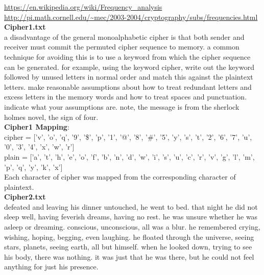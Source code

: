 \documentclass{exam}
\begin{document}
\url{https://en.wikipedia.org/wiki/Frequency_analysis} \\
\url{http://pi.math.cornell.edu/~mec/2003-2004/cryptography/subs/frequencies.html}
\vspace{0.05in} \\
\textbf{Cipher1.txt} \vspace{0.05in} \\
a disadvantage of the general monoalphabetic cipher is that both sender and receiver must commit the permuted cipher sequence to memory. a common technique for avoiding this is to use a keyword from which the cipher sequence can be generated. for example, using the keyword cipher, write out the keyword followed by unused letters in normal order and match this against the plaintext letters. make reasonable assumptions about how to treat redundant letters and excess letters in the memory words and how to treat spaces and punctuation. indicate what your assumptions are. note, the message is from the sherlock holmes novel, the sign of four. \vspace{0.05in} \\
\textbf{Cipher1 Mapping}: \vspace{0.05in} \\
cipher = ['v', 'o', 'q', '9', '\$', 'p', '1', '@', '8', '\#', '5', 'y', 's', 't', '2', '6', '7', 'u', '0', '3', '4', 'x', 'w', 'r'] \vspace{0.05in} \\
plain = ['a', 't', 'h', 'e', 'o', 'f', 'b', 'n', 'd', 'w', 'i', 's', 'u', 'c', 'r', 'v', 'g', 'l', 'm', 'p', 'q', 'y', 'k', 'x'] \vspace{0.05in} \\
Each character of cipher was mapped from the corresponding character of plaintext.
\vspace{0.05in}\\
\textbf{Cipher2.txt} \vspace{0.05in} \\
defeated and leaving his dinner untouched, he went to bed. that night he did not sleep well, having feverish dreams, having no rest. he was unsure whether he was asleep or dreaming. conscious, unconscious, all was a blur. he remembered crying, wishing, hoping, begging, even laughing. he floated through the universe, seeing stars, planets, seeing earth, all but himself. when he looked down, trying to see his body, there was nothing. it was just that he was there, but he could not feel anything for just his presence. \vspace{0.05in} \\
\end{document}
